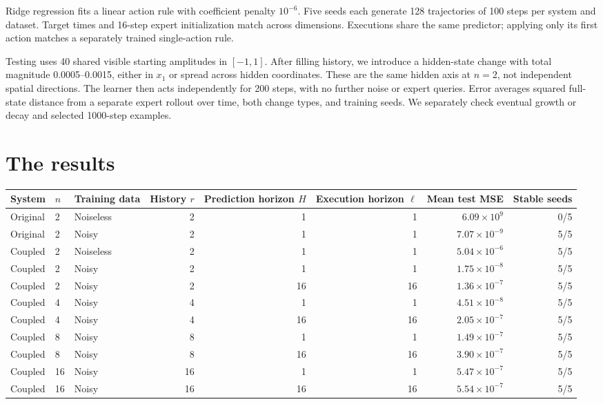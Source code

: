\documentclass{l4dc2026}
\begin{document}
Ridge regression fits a linear action rule with coefficient penalty $10^{-6}$. Five seeds each generate 128 trajectories of 100 steps per system and dataset. Target times and 16-step expert initialization match across dimensions. Executions share the same predictor; applying only its first action matches a separately trained single-action rule.

Testing uses 40 shared visible starting amplitudes in $[-1,1]$. After filling history, we introduce a hidden-state change with total magnitude 0.0005--0.0015, either in $x_1$ or spread across hidden coordinates. These are the same hidden axis at $n=2$, not independent spatial directions. The learner then acts independently for 200 steps, with no further noise or expert queries. Error averages squared full-state distance from a separate expert rollout over time, both change types, and training seeds. We separately check eventual growth or decay and selected 1000-step examples.

\section{The results}
\begin{center}\small
\begin{tabular}{ll lrrrrr}\toprule
System & $n$ & Training data & \shortstack{History\\$r$} & \shortstack{Prediction\\horizon $H$} & \shortstack{Execution\\horizon $\ell$} & Mean test MSE & Stable seeds\\\midrule
Original & 2 & Noiseless & 2 & 1 & 1 & $6.09\times10^{9}$ & 0/5\\
Original & 2 & Noisy & 2 & 1 & 1 & $7.07\times10^{-9}$ & 5/5\\
Coupled & 2 & Noiseless & 2 & 1 & 1 & $5.04\times10^{-6}$ & 5/5\\
Coupled & 2 & Noisy & 2 & 1 & 1 & $1.75\times10^{-8}$ & 5/5\\
Coupled & 2 & Noisy & 2 & 16 & 16 & $1.36\times10^{-7}$ & 5/5\\
Coupled & 4 & Noisy & 4 & 1 & 1 & $4.51\times10^{-8}$ & 5/5\\
Coupled & 4 & Noisy & 4 & 16 & 16 & $2.05\times10^{-7}$ & 5/5\\
Coupled & 8 & Noisy & 8 & 1 & 1 & $1.49\times10^{-7}$ & 5/5\\
Coupled & 8 & Noisy & 8 & 16 & 16 & $3.90\times10^{-7}$ & 5/5\\
Coupled & 16 & Noisy & 16 & 1 & 1 & $5.47\times10^{-7}$ & 5/5\\
Coupled & 16 & Noisy & 16 & 16 & 16 & $5.54\times10^{-7}$ & 5/5\\
\bottomrule\end{tabular}
\end{center}
\end{document}
